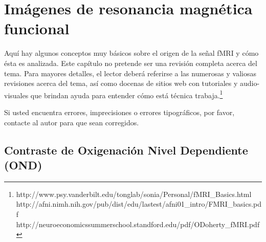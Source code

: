 \documentclass[12pt,a5,twoside]{book}
\begin{document}
\chapter{Imágenes de resonancia magnética funcional}

Aquí hay algunos conceptos muy básicos sobre el origen de la señal fMRI y cómo ésta es analizada. Este capítulo no pretende ser una revisión completa acerca del tema. Para mayores detalles, el lector deberá referirse a las numerosas y valiosas revisiones acerca del tema, así como docenas de sitios web con tutoriales y audio-visuales que brindan ayuda para entender cómo está técnica trabaja.\footnote{http://www.psy.vanderbilt.edu/tonglab/sonia/Personal/fMRI\_Basics.html\\ http://afni.nimh.nih.gov/pub/dist/edu/lastest/afni01\_intro/FMRI\_basics.pdf\\http://neuroeconomics\-summerschool.standford.edu/pdf/ODoherty\_fMRI.pdf}

Si usted encuentra errores, imprecisiones o errores tipográficos, por favor, contacte al autor para que sean corregidos.

\section{Contraste de Oxigenación Nivel Dependiente (OND)}
\end{document}
